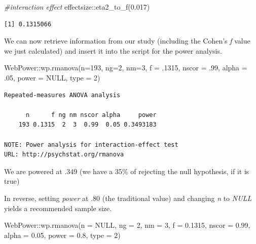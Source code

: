 \documentclass[
  11pt,
]{book}
\newenvironment{Shaded}{\begin{snugshade}}{\end{snugshade}}
\newcommand{\AttributeTok}[1]{\textcolor[rgb]{0.77,0.63,0.00}{#1}}
\newcommand{\CommentTok}[1]{\textcolor[rgb]{0.56,0.35,0.01}{\textit{#1}}}
\newcommand{\ConstantTok}[1]{\textcolor[rgb]{0.00,0.00,0.00}{#1}}
\newcommand{\DecValTok}[1]{\textcolor[rgb]{0.00,0.00,0.81}{#1}}
\newcommand{\FloatTok}[1]{\textcolor[rgb]{0.00,0.00,0.81}{#1}}
\newcommand{\FunctionTok}[1]{\textcolor[rgb]{0.00,0.00,0.00}{#1}}
\newcommand{\NormalTok}[1]{#1}
\newcommand{\SpecialCharTok}[1]{\textcolor[rgb]{0.00,0.00,0.00}{#1}}
\begin{document}
\begin{Shaded}
\begin{Highlighting}[]
\CommentTok{\#interaction effect}
\NormalTok{effectsize}\SpecialCharTok{::}\FunctionTok{eta2\_to\_f}\NormalTok{(}\FloatTok{0.017}\NormalTok{) }
\end{Highlighting}
\end{Shaded}

\begin{verbatim}
[1] 0.1315066
\end{verbatim}

We can now retrieve information from our study (including the Cohen's \emph{f} value we just calculated) and insert it into the script for the power analysis.

\begin{Shaded}
\begin{Highlighting}[]
\NormalTok{WebPower}\SpecialCharTok{::}\FunctionTok{wp.rmanova}\NormalTok{(}\AttributeTok{n=}\DecValTok{193}\NormalTok{, }\AttributeTok{ng=}\DecValTok{2}\NormalTok{, }\AttributeTok{nm=}\DecValTok{3}\NormalTok{, }\AttributeTok{f =}\NormalTok{ .}\DecValTok{1315}\NormalTok{, }\AttributeTok{nscor =}\NormalTok{ .}\DecValTok{99}\NormalTok{, }\AttributeTok{alpha =}\NormalTok{ .}\DecValTok{05}\NormalTok{, }\AttributeTok{power =} \ConstantTok{NULL}\NormalTok{, }\AttributeTok{type =} \DecValTok{2}\NormalTok{)}
\end{Highlighting}
\end{Shaded}

\begin{verbatim}
Repeated-measures ANOVA analysis

      n      f ng nm nscor alpha     power
    193 0.1315  2  3  0.99  0.05 0.3493183

NOTE: Power analysis for interaction-effect test
URL: http://psychstat.org/rmanova
\end{verbatim}

We are powered at .349 (we have a 35\% of rejecting the null hypothesis, if it is true)

In reverse, setting \emph{power} at .80 (the traditional value) and changing \emph{n} to \emph{NULL} yields a recommended sample size.

\begin{Shaded}
\begin{Highlighting}[]
\NormalTok{WebPower}\SpecialCharTok{::}\FunctionTok{wp.rmanova}\NormalTok{(}\AttributeTok{n =} \ConstantTok{NULL}\NormalTok{, }\AttributeTok{ng =} \DecValTok{2}\NormalTok{, }\AttributeTok{nm =} \DecValTok{3}\NormalTok{, }\AttributeTok{f =} \FloatTok{0.1315}\NormalTok{, }\AttributeTok{nscor =} \FloatTok{0.99}\NormalTok{,}
    \AttributeTok{alpha =} \FloatTok{0.05}\NormalTok{, }\AttributeTok{power =} \FloatTok{0.8}\NormalTok{, }\AttributeTok{type =} \DecValTok{2}\NormalTok{)}
\end{Highlighting}
\end{Shaded}
\end{document}
